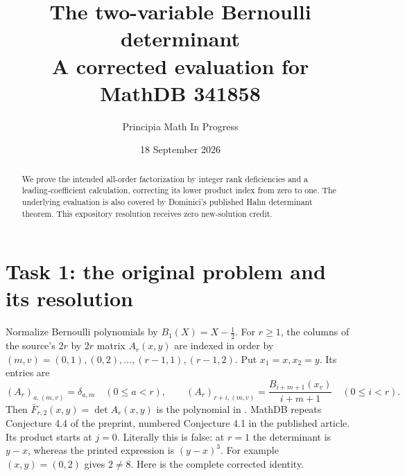 \documentclass[11pt]{article}
\title{The two-variable Bernoulli determinant\\
\large A corrected evaluation for MathDB 341858}
\author{Principia Math In Progress}
\date{18 September 2026}
\begin{document}
\maketitle
\begin{abstract}
We prove the intended all-order factorization by integer rank
deficiencies and a leading-coefficient calculation, correcting its
lower product index from zero to one. The underlying evaluation is
also covered by Dominici's published Hahn determinant theorem.
This expository resolution receives zero new-solution credit.
\end{abstract}

\section*{Task 1: the original problem and its resolution}
Normalize Bernoulli polynomials by $B_1(X)=X-\tfrac12$.
For $r\geq1$, the columns of the source's $2r$ by $2r$ matrix
$A_r(x,y)$ are indexed in order by
$(m,v)=(0,1),(0,2),\ldots,(r-1,1),(r-1,2)$.
Put $x_1=x,x_2=y$. Its entries are
\[
 (A_r)_{a,(m,v)}=\delta_{a,m}\quad(0\leq a<r),\qquad
 (A_r)_{r+i,(m,v)}=\frac{B_{i+m+1}(x_v)}{i+m+1}
                 \quad(0\leq i<r).
\]
Then $\bar F_{r,2}(x,y)=\det A_r(x,y)$ is the polynomial
in \cite[(4.7)]{C}. MathDB repeats Conjecture 4.4 of the preprint,
numbered Conjecture 4.1 in the published article.
Its product starts at $j=0$. Literally this is false: at $r=1$
the determinant is $y-x$, whereas the printed expression is $(y-x)^3$.
For example $(x,y)=(0,2)$ gives $2\ne8$.
Here is the complete corrected identity.
\end{document}
